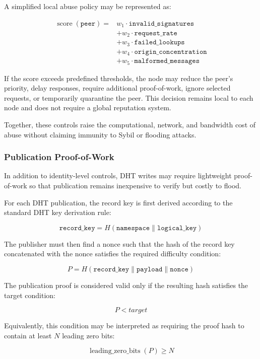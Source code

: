 \documentclass[12pt,a4paper]{article}
\begin{document}
A simplified local abuse policy may be represented as:

\[
\begin{aligned}
\operatorname{score}(\texttt{peer}) ={}&
w_1 \cdot \texttt{invalid\_signatures} \\
&+ w_2 \cdot \texttt{request\_rate} \\
&+ w_3 \cdot \texttt{failed\_lookups} \\
&+ w_4 \cdot \texttt{origin\_concentration} \\
&+ w_5 \cdot \texttt{malformed\_messages}
\end{aligned}
\]

If the score exceeds predefined thresholds, the node may reduce the peer's priority,
delay responses, require additional proof-of-work, ignore selected requests, or
temporarily quarantine the peer. This decision remains local to each node and does
not require a global reputation system.

Together, these controls raise the computational, network, and bandwidth cost of
abuse without claiming immunity to Sybil or flooding attacks.

\subsubsection{Publication Proof-of-Work}

In addition to identity-level controls, DHT writes may require lightweight
proof-of-work so that publication remains inexpensive to verify but costly to flood.

For each DHT publication, the record key is first derived according to the standard
DHT key derivation rule:

\[
\texttt{record\_key} = H(\texttt{namespace} \parallel \texttt{logical\_key})
\]

The publisher must then find a nonce such that the hash of the record key
concatenated with the nonce satisfies the required difficulty condition:

\[
P = H(\texttt{record\_key} \parallel \texttt{payload} \parallel \texttt{nonce})
\]

The publication proof is considered valid only if the resulting hash satisfies the
target condition:

\[
P < target
\]

Equivalently, this condition may be interpreted as requiring the proof hash to
contain at least \(N\) leading zero bits:

\[
\operatorname{leading\_zero\_bits}(P) \geq N
\]
\end{document}
